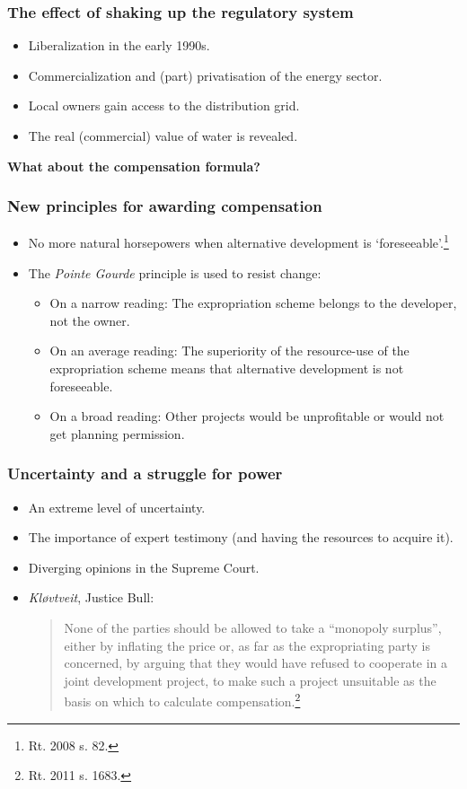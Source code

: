 \documentclass{beamer}
\begin{document}
\begin{frame}
\frametitle{The effect of shaking up the regulatory system}
\begin{itemize}
\item Liberalization in the early 1990s.
\item Commercialization and (part) privatisation of the energy sector.
\item Local owners gain access to the distribution grid.
\item The real (commercial) value of water is revealed.
\end{itemize}
{\bf What about the compensation formula?}
\end{frame}

\begin{frame}
\frametitle{New principles for awarding compensation}
\begin{itemize}
\item No more natural horsepowers when alternative development is `foreseeable'.\footnote{Rt. 2008 s. 82.}
\item The {\it Pointe Gourde} principle is used to resist change: \pause
\begin{itemize}
\item On a narrow reading: The expropriation scheme belongs to the developer, not the owner.
\item On an average reading: The superiority of the resource-use of the expropriation scheme means that alternative development is not foreseeable.
\item On a broad reading: Other projects would be unprofitable or would not get planning permission.
\end{itemize}
\end{itemize}
\end{frame}

\begin{frame}
\frametitle{Uncertainty and a struggle for power}
\begin{itemize}
\item An extreme level of uncertainty. 
\item The importance of expert testimony (and having the resources to acquire it).
\item Diverging opinions in the Supreme Court.
\item {\it Kløvtveit}, Justice Bull:
\begin{quote}
None of the parties should be allowed to take a ``monopoly surplus'', either by inflating the price or, as far as the expropriating party is concerned, by arguing that they would have refused to cooperate in a joint development project, to make such a project unsuitable as the basis on which to calculate compensation.\footnote{Rt. 2011 s. 1683.}\end{quote} 
\end{itemize}
\end{frame}
\end{document}
